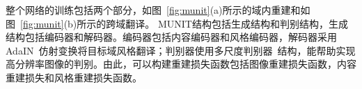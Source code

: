 整个网络的训练包括两个部分，如图~\ref{fig:munit}(a)所示的域内重建和如图~\ref{fig:munit}(b)所示的跨域翻译。
MUNIT结构包括生成结构和判别结构，生成结构包括编码器和解码器。编码器包括内容编码器和风格编码器，解码器采用AdaIN~\cite{huang2017arbitrary}仿射变换将目标域风格翻译；判别器使用多尺度判别器~\cite{wang2018high}结构，能帮助实现高分辨率图像的判别。由此，可以构建重建损失函数包括图像重建损失函数，内容重建损失和风格重建损失函数。





